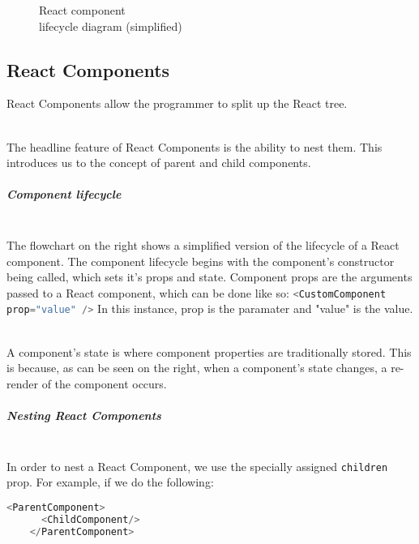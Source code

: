 \documentclass[../../main.tex]{subfiles}
\begin{document}
\begin{dummyenv}
\begin{wrapfigure}{r}[25pt]{0.4\textwidth}
\begin{framed}{}
{
      }

      \caption{
        \centering
        React component\\
        lifecycle diagram (simplified)
      }
    \end{framed}
    \label{fig:wrapfig}
  \end{wrapfigure}

  \paragraph{} %

  \subsection{React Components}

  \noindent React Components allow the programmer to split up the React tree.

  \noindent \\ The headline feature of React Components is
  the ability to nest them. This introduces us to the concept
  of parent and child components.

  \subparagraph{Component lifecycle\\}

  \noindent \\ The flowchart on the right shows a simplified version of the lifecycle
  of a React component. The component lifecycle begins with the component's constructor
  being called, which sets it's props and state. Component props are the arguments passed to
  a React component, which can be done like so:
  \lstinline[language=typescript]{<CustomComponent prop="value" />}
  In this instance, prop is the paramater and "value" is the value.

  \noindent \\ A component's state is where component properties are traditionally stored.
  This is because, as can be seen on the right, when a component's state changes, a re-render
  of the component occurs.

  \subparagraph{Nesting React Components\\}

  \noindent \\ In order to nest a React Component, we use the specially assigned
  \lstinline{children} prop. For example, if we do the following:

  \begin{lstlisting}[language=typescript]
    <ParentComponent>
      <ChildComponent/>
    </ParentComponent>
  \end{lstlisting}
\end{dummyenv}
\end{document}
